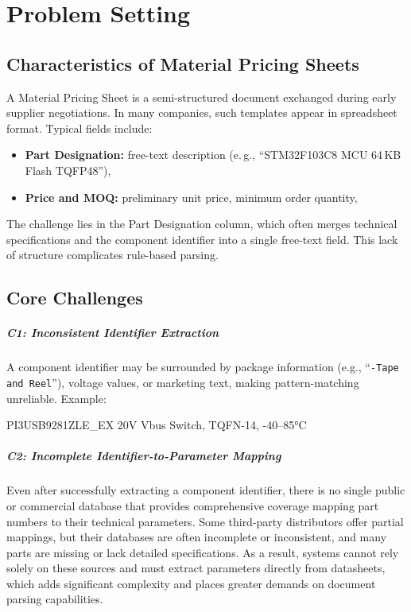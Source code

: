 \chapter{Problem Setting}
\label{chapter:problem}

\section{Characteristics of Material Pricing Sheets}
A Material Pricing Sheet is a semi-structured document exchanged during early supplier negotiations.  
In many companies, such templates appear in spreadsheet format.  
Typical fields include:  

\begin{itemize}
  \item \textbf{Part Designation:} free-text description (e.\,g., ``STM32F103C8 MCU 64\,KB Flash TQFP48''),
  \item \textbf{Price and MOQ:} preliminary unit price, minimum order quantity,
\end{itemize}

The challenge lies in the Part Designation column, which often merges technical specifications and the component identifier into a single free-text field. This lack of structure complicates rule-based parsing.

\section{Core Challenges}
\paragraph{C1: Inconsistent Identifier Extraction}  
A component identifier may be surrounded by package information (e.g., ``\texttt{-Tape and Reel}''), voltage values, or marketing text, making pattern-matching unreliable.  
Example:  
\begin{center}
\ttfamily PI3USB9281ZLE\_EX   20V Vbus Switch, TQFN-14, -40–85°C
\end{center}

\paragraph{C2: Incomplete Identifier-to-Parameter Mapping}
Even after successfully extracting a component identifier, there is no single public or commercial database that provides comprehensive coverage mapping part numbers to their technical parameters. Some third-party distributors offer partial mappings, but their databases are often incomplete or inconsistent, and many parts are missing or lack detailed specifications. As a result, systems cannot rely solely on these sources and must extract parameters directly from datasheets, which adds significant complexity and places greater demands on document parsing capabilities.


